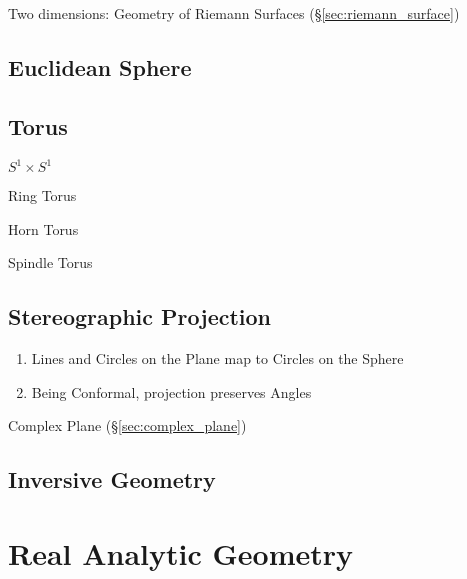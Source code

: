 Two dimensions: Geometry of Riemann Surfaces
(\S\ref{sec:riemann_surface})



\subsection{Euclidean Sphere}\label{sec:euclidean_sphere}

\subsection{Torus}\label{sec:torus}

$S^1 \times S^1$

Ring Torus

Horn Torus

Spindle Torus



\subsection{Stereographic Projection}\label{sec:stereographic_projection}

\begin{enumerate}
  \item Lines and Circles on the Plane map to Circles on the Sphere
  \item Being Conformal, projection preserves Angles
\end{enumerate}

Complex Plane (\S\ref{sec:complex_plane})



\subsection{Inversive Geometry}\label{sec:inversive_geometry}



\section{Real Analytic Geometry}\label{sec:real_analytic_geometry}
